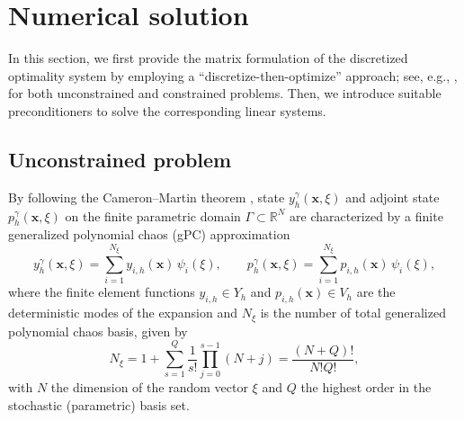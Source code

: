 \documentclass[a4paper,10pt]{article}
\numberwithin{theorem}{section}
\begin{document}


\section{Numerical solution}\label{sec:linear_system} 

In this section, we first provide the matrix formulation of the discretized optimality system by employing a ``discretize-then-optimize'' approach; see, e.g., \cite{FTroeltzsch_2010a}, for both unconstrained and constrained problems. Then, we introduce suitable preconditioners to solve the corresponding linear systems.

\subsection{Unconstrained problem}

By following the Cameron--Martin theorem \cite{RHCameron_WTMartin_1947a}, state $y_h^\gamma(\boldsymbol{x},\xi)$ and  adjoint state $p_h^\gamma(\boldsymbol{x},\xi)$ on the finite parametric domain $\Gamma \subset \mathbb{R}^N$ 
are characterized by a finite generalized polynomial chaos (gPC) approximation
\begin{equation}
		y_h^\gamma(\boldsymbol{x},\xi) = \sum \limits_{i=1}^{N_{\xi}} y_{i,h}(\boldsymbol{x})\,\psi_i(\xi), \qquad 
		p_h^\gamma(\boldsymbol{x},\xi) = \sum \limits_{i=1}^{N_{\xi}} p_{i,h}(\boldsymbol{x})\,\psi_i(\xi),
\end{equation}
where the finite element functions $y_{i,h}\in Y_h$ and $p_{i,h}(\boldsymbol{x})\in V_h$ are the deterministic modes of the expansion and $N_{\xi}$ is the number of total generalized polynomial chaos  basis, given by
\begin{equation*}	
	N_{\xi} = 1 + \sum \limits_{s=1}^{Q} \frac{1}{s!} \prod \limits_{j=0}^{s-1} (N + j) = \frac{(N+Q)!}{N!Q!},
\end{equation*}
with $ N $ the dimension of the random vector $\xi$   and  $ Q $  the highest order in the stochastic (parametric) basis set. 
\end{document}
